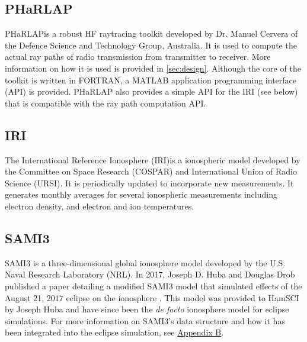 \documentclass[12pt,letterpaper]{article}
\begin{document}
\subsection{PHaRLAP}
\label{sec:dependencies:pharlap}

PHaRLAP\footnotemark is a robust HF raytracing toolkit developed by Dr. Manuel
Cervera of the Defence Science and Technology Group, Australia. It is used to
compute the actual ray paths of radio transmission from transmitter to
receiver. More information on how it is used is provided in
\autoref{sec:design}. Although the core of the toolkit is written in FORTRAN, a
MATLAB application programming interface (API) is provided. PHaRLAP also
provides a simple API for the IRI (see below) that is compatible with the ray
path computation API.


\subsection{IRI}
\label{sec:dependencies:iri}

The International Reference Ionosphere (IRI)\footnotemark is a ionospheric model
developed by the Committee on Space Research (COSPAR) and International Union of
Radio Science (URSI). It is periodically updated to incorporate new
measurements. It generates monthly averages for several ionospheric measurements
including electron density, and electron and ion temperatures.


\subsection{SAMI3}
\label{sec:dependencies:sami3}

SAMI3 is a three-dimensional global ionosphere model developed by the U.S. Naval
Research Laboratory (NRL). In 2017, Joseph D. Huba and Douglas Drob published a
paper detailing a modified SAMI3 model that simulated effects of the August 21,
2017 eclipse on the ionosphere \citep{Huba2017}. This model was provided to
HamSCI by Joseph Huba and have since been the {\it de facto} ionosphere model
for eclipse simulations. For more information on SAMI3's data structure and how
it has been integrated into the eclipse simulation, see
\hyperref[sec:sami3_df]{Appendix B}.
\end{document}
